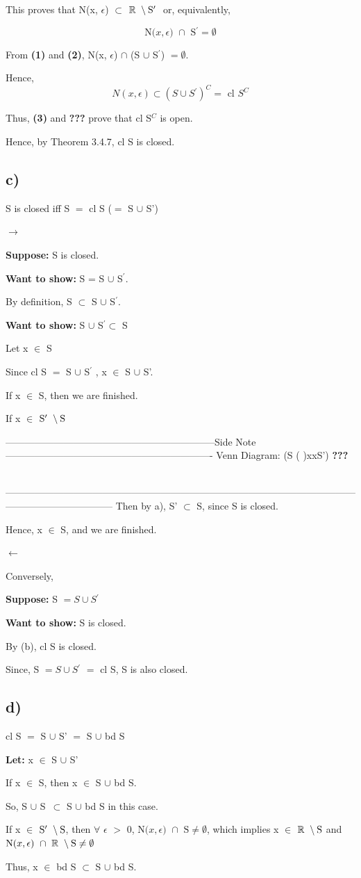 \documentclass{article}
\newcommand{\mt}[1]{\ensuremath{#1}}
\newcommand\ssc[2][\DefaultOpt]{%
  \def\DefaultOpt{#2}%
  \subsection[#1]{#2}%
}
\newcommand{\lt}[1]{\textbf{Let: } #1}
\newcommand{\supp}[1]{\textbf{Suppose: } #1}
\newcommand{\wts}[1]{\textbf{Want to show: } #1}
\newcommand{\bpth}[1]{\textbf{(#1)}}
\newcommand{\step}[2]{\begin{equation}\tag{#2}#1\end{equation}}
\newcommand{\sidenote}[1]{-----------------------------------------------------------------Side Note----------------------------------------------------------------
#1 \

---------------------------------------------------------------------------------------------------------------------------------------------}
\newcommand{\br}{\mt{\mathbb{R}} }       %
\newcommand{\ep}{\mt{\epsilon} }         %
\newcommand{\fa}{\mt{\forall} }          %
\newcommand{\mem}{\mt{\in} }
\newcommand{\es}{\mt{\emptyset}}        %
\newcommand{\sbs}{\mt{\subset} }         %
\newcommand{\lra}{ \mt{\longrightarrow} } %
\newcommand{\lla}{ \mt{\longleftarrow} }  %
\newcommand{\eql}{\mt{=} }
\newcommand{\pr}{\mt{^\prime} } 		   %
\newcommand{\bnt}[2]{\mt{\textrm{#1}\setminus{\textrm{#2}}}}
\newcommand{\nbho}[3]{\textrm{N(}#1, #2\textrm{) }\cap \textrm{ #3} \neq \emptyset}
\newcommand{\nbhe}[3]{\textrm{N(}#1, #2\textrm{) }\cap \textrm{ #3} = \emptyset}
\begin{document}
This proves that N(x, $\ep$) \sbs \bnt{\br}{S\pr} or, equivalently,

\step{\nbhe{x}{\epsilon}{S$\pr$}}{2}

From \bpth{1} and \bpth{2}, N(x, $\ep$) $\cap$ (S $\cup$ S$\pr$) $= \es$. \

Hence, 
\step{N(x, \ep) \sbs (S \cup S\pr)^C = \textrm{ cl }S^C}{3}

Thus, \bpth{3} and \textbf{???} prove that cl S$^C$ is open. \

Hence, by Theorem 3.4.7, cl S is closed.

\ssc{c)} S is closed iff S $=$ cl S ($=$ S $\cup$ S') \

$\lra$ \

\supp{S is closed.}

\wts{S = S $\cup$ S$\pr$.} \

By definition, S $\subset$ S $\cup$ S$\pr$. \

\wts{S $\cup$ S$\pr \subset$ S}

Let x $\in$ S

Since cl S \eql S $\cup$ S\pr, x \mem S $\cup$ S'. \

If x $\in$ S, then we are finished. \

If x $\in$ $\bnt{S\pr}{S}$ \

\sidenote{Venn Diagram: (S     (    )xxS') \textbf{???}}
Then by a), S' $\subset$ S, since S is closed.

Hence, x $\in$ S, and we are finished.\

$\lla$ \

Conversely, \

\supp{S $= S \cup S\pr$} \

\wts{S is closed.}\

By (b), cl S is closed. \

Since, S $= S \cup S\pr$ $=$ cl S, S is also closed.



\ssc{d)} cl S $=$ S $\cup$ S' $=$ S $\cup$ bd S \

\lt{x $\in$ S $\cup$ S'}

If x $\in$ S, then x $\in$ S $\cup$ bd S.\

So, S $\cup$ S\ $\sbs$ S $\cup$ bd S in this case. \

If x \mem \bnt{S\pr}{S}, then \fa \ep $>$ 0, $\nbho{x}{\epsilon}{S}$, which implies x \mem \bnt{\br}{S} and $\nbho{x}{\epsilon}{$\bnt{\br}{S}$}$ \

Thus, x $\in$ bd S $\subset$ S $\cup$ bd S. \
\end{document}
